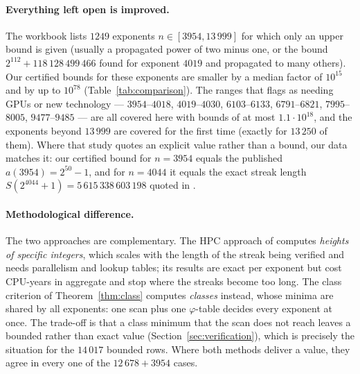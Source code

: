 \documentclass[11pt]{article}
\theoremstyle{remark}
\begin{document}
\paragraph{Everything left open is improved.} The workbook lists $1249$ exponents $n\in[3954,13\,999]$
for which only an upper bound is given (usually a propagated power of two minus one, or the bound
$2^{112}+118\,128\,499\,466$ found for exponent $4019$ and propagated to many others). Our certified
bounds for these exponents are smaller by a median factor of $10^{15}$ and by up to $10^{78}$
(Table~\ref{tab:comparison}). The ranges that \cite{frinkle2025} flags as needing GPUs or new
technology --- $3954$--$4018$, $4019$--$4030$, $6103$--$6133$, $6791$--$6821$, $7995$--$8005$,
$9477$--$9485$ --- are all covered here with bounds of at most $1.1\cdot10^{18}$, and the exponents
beyond $13\,999$ are covered for the first time (exactly for $13\,250$ of them). Where that study quotes
an explicit value rather than a bound, our data matches it: our certified bound for $n=3954$ equals the
published $a(3954)=2^{50}-1$, and for $n=4044$ it equals the exact streak length
$S(2^{4044}+1)=5\,615\,338\,603\,198$ quoted in \cite{frinkle2025}. 

\begin{table}[ht]
\centering
\small
\caption{The ranges of exponents that \cite{frinkle2025} reports as open, and the largest bound we
certify inside each.}
\label{tab:comparison}

\end{table}

\paragraph{Methodological difference.} The two approaches are complementary. The HPC approach of
\cite{frinkle2025} computes \emph{heights of specific integers}, which scales with the length of the
streak being verified and needs parallelism and lookup tables; its results are exact per exponent but
cost CPU-years in aggregate and stop where the streaks become too long. The class criterion of
Theorem~\ref{thm:class} computes \emph{classes} instead, whose minima are shared by all exponents: one
scan plus one $\varphi$-table decides every exponent at once. The trade-off is that a class minimum
that the scan does not reach leaves a bounded rather than exact value (Section~\ref{sec:verification}),
which is precisely the situation for the $14\,017$ bounded rows. Where both methods deliver a value,
they agree in every one of the $12\,678+3954$ cases.
\end{document}
